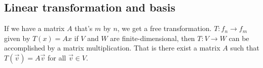


\subsection{Linear transformation and basis}

If we have a matrix $A$ that's $m$ by $n$, we get a free transformation. 
$T: f_n \to f_m$ given by $T(x) = Ax$ if $V$ and $W$ are finite-dimensional, then $T: V \to W$ can be accomplished by a matrix multiplication. That is there exist a matrix $A$ such that $T(\vec{v}) = A\vec{v}$ for all $\vec{v} \in V$.

